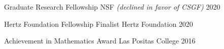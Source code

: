 \begin{cvhonors}
  \cvhonor
    {Graduate Research Fellowship} %
    {NSF \textit{(declined in favor of CSGF)}} %
    {} %
    {2020} %

  \cvhonor
    {Hertz Foundation Fellowship Finalist} %
    {Hertz Foundation} %
    {} %
    {2020} %

  \cvhonor
    {Achievement in Mathematics Award} %
    {Las Positas College} %
    {} %
    {2016} %

\end{cvhonors}

